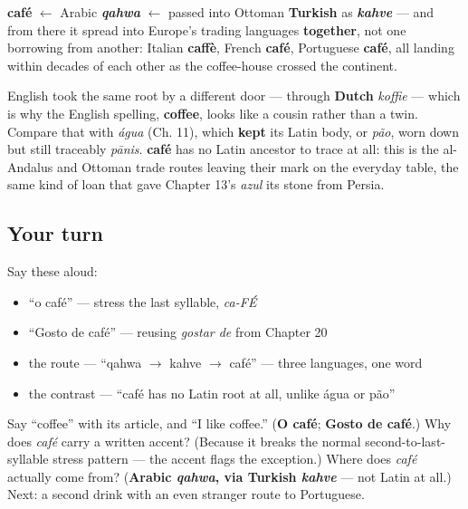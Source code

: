 \begin{cousinweb}
\textbf{café} $\leftarrow$ Arabic \emph{\textbf{qahwa}} $\leftarrow$ passed into Ottoman \textbf{Turkish} as \emph{\textbf{kahve}} — and from there it spread into Europe's trading languages \textbf{together}, not one borrowing from another: Italian \textbf{caffè}, French \textbf{café}, Portuguese \textbf{café}, all landing within decades of each other as the coffee-house crossed the continent.

English took the same root by a different door — through \textbf{Dutch} \emph{koffie} — which is why the English spelling, \textbf{coffee}, looks like a cousin rather than a twin. Compare that with \emph{água} (Ch. 11), which \textbf{kept} its Latin body, or \emph{pão}, worn down but still traceably \emph{pānis}. \textbf{café} has no Latin ancestor to trace at all: this is the al-Andalus and Ottoman trade routes leaving their mark on the everyday table, the same kind of loan that gave Chapter 13's \emph{azul} its stone from Persia.
\end{cousinweb}

\subsection*{Your turn}
Say these aloud:

\begin{itemize}
\raggedright
  \item \textquotedblleft{}o café\textquotedblright{} — stress the last syllable, \emph{ca-FÉ}
  \item \textquotedblleft{}Gosto de café\textquotedblright{} — reusing \emph{gostar de} from Chapter 20
  \item the route — \textquotedblleft{}qahwa $\to$ kahve $\to$ café\textquotedblright{} — three languages, one word
  \item the contrast — \textquotedblleft{}café has no Latin root at all, unlike água or pão\textquotedblright{}
\end{itemize}

\begin{tcolorbox}[breakable,colback=teal!4,colframe=teal!35!black,title={Before you move on}]
Say \textquotedblleft{}coffee\textquotedblright{} with its article, and \textquotedblleft{}I like coffee.\textquotedblright{} (\textbf{O café}; \textbf{Gosto de café}.) Why does \emph{café} carry a written accent? (Because it breaks the normal second-to-last-syllable stress pattern — the accent flags the exception.) Where does \emph{café} actually come from? (\textbf{Arabic \emph{qahwa}, via Turkish \emph{kahve}} — not Latin at all.) Next: a second drink with an even stranger route to Portuguese.
\end{tcolorbox}
